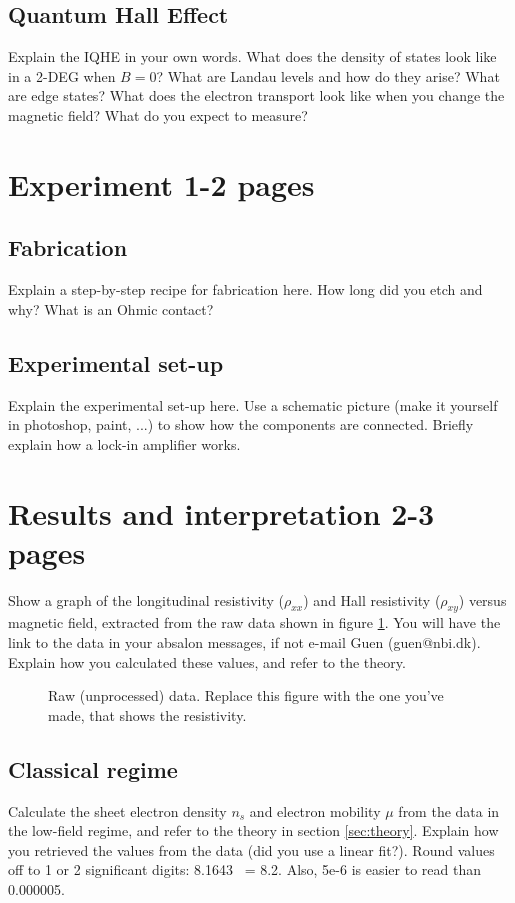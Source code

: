 \documentclass[a4paper]{article}
\begin{document}
      \subsection{Quantum Hall Effect}
      Explain the IQHE in your own words. What does the density of states look like in a 2-DEG when $B=0$? What are Landau levels and how do they arise? What are edge states? What does the electron transport look like when you change the magnetic field? What do you expect to measure?
      
      \section{Experiment 1-2 pages}
      \subsection{Fabrication}
      Explain a step-by-step recipe for fabrication here. How long did you etch and why? What is an Ohmic contact?
      \subsection{Experimental set-up}
      Explain the experimental set-up here. Use a schematic picture (make it yourself in photoshop, paint, ...) to show how the components are connected. Briefly explain how a lock-in amplifier works.
      
      \section{Results and interpretation 2-3 pages}
      Show a graph of the longitudinal resistivity ($\rho_{xx}$) and Hall resistivity ($\rho_{xy}$) versus magnetic field, extracted from the raw data shown in figure \ref{fig:data}. You will have the link to the data in your absalon messages, if not e-mail Guen (guen@nbi.dk). Explain how you calculated these values, and refer to the theory.
      
      \begin{figure}
      \centering
      \caption{\label{fig:data}Raw (unprocessed) data. Replace this figure with the one you've made, that shows the resistivity.}
      \end{figure}
      
      \subsection{Classical regime}
      Calculate the sheet electron density $n_{s}$ and electron mobility $\mu$ from the data in the low-field regime, and refer to the theory in section \ref{sec:theory}. Explain how you retrieved the values from the data (did you use a linear fit?).
      Round values off to 1 or 2 significant digits: 8.1643 ~= 8.2. Also, 5e-6 is easier to read than 0.000005.
      
\end{document}
